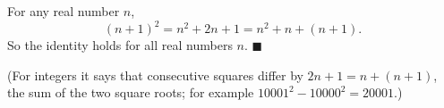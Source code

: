 For any real number $n$,
\[(n+1)^2=n^2+2n+1=n^2+n+(n+1).\]
So the identity holds for all real numbers $n$. $\blacksquare$

(For integers it says that consecutive squares differ by $2n+1=n+(n+1)$, the sum of the two square roots; for example $10001^2-10000^2=20001$.)

